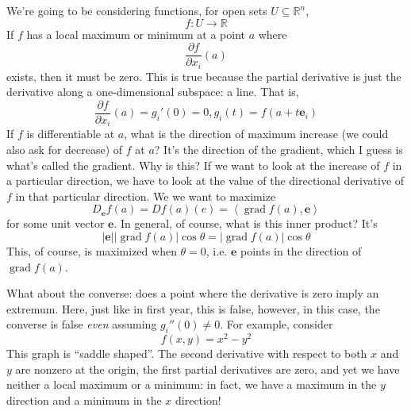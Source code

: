\documentclass{article}
\DeclareMathOperator{\grad}{grad}
\newcommand{\reals}[0]{\mathbb{R}}
\newcommand{\ip}[2]{\left\langle#1,#2\right\rangle}
\newcommand{\prt}[2]{\frac{\partial #1}{\partial #2}}
\newcommand{\mb}[1]{\mathbf{#1}}
\begin{document}
We're going to be considering functions, for open sets \(U \subseteq \reals^n\),
\begin{equation}f: U \to \reals\end{equation}
If \(f\) has a local maximum or minimum at a point \(a\) where
\begin{equation}\prt{f}{x_i}(a)\end{equation}
exists, then it must be zero. This is true because the partial derivative is just the derivative along a one-dimensional subspace: a line. That is,
\begin{equation}\prt{f}{x_i}(a) = g_i'(0) = 0, g_i(t) = f(a + t\mb{e}_i)\end{equation}
If \(f\) is differentiable at \(a\), what is the direction of maximum increase (we could also ask for decrease) of \(f\) at \(a\)? It's the direction of the gradient, which I guess is what's called the gradient. Why is this? If we want to look at the increase of \(f\) in a particular direction, we have to look at the value of the directional derivative of \(f\) in that particular direction. We we want to maximize
\begin{equation}D_{\mb{e}}f(a) = Df(a)(e) = \ip{\grad{f(a)}}{\mb{e}}\end{equation}
for some unit vector \(\mb{e}\). In general, of course, what is this inner product? It's
\begin{equation}|\mb{e}||\grad f(a)|\cos\theta = |\grad f(a)|\cos\theta\end{equation}
This, of course, is maximized when \(\theta = 0\), i.e. \(\mb{e}\) points in the direction of \(\grad f(a)\).

What about the converse: does a point where the derivative is zero imply an extremum. Here, just like in first year, this is false, however, in this case, the converse is false \textit{even} assuming \(g_i''(0) \neq 0\). For example, consider
\begin{equation}f(x, y) = x^2 - y^2\end{equation}
This graph is ``saddle shaped''. The second derivative with respect to both \(x\) and \(y\) are nonzero at the origin, the first partial derivatives are zero, and yet we have neither a local maximum or a minimum: in fact, we have a maximum in the \(y\) direction and a minimum in the \(x\) direction!
\end{document}
